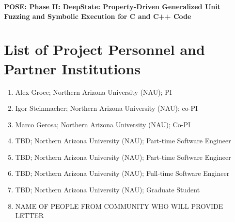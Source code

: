 \documentclass[12pt]{article}
\begin{document}
\begin{center}
{\Large\sf\textbf{POSE: Phase II: DeepState: Property-Driven Generalized Unit Fuzzing and Symbolic Execution for C and C++ Code}}
\end{center}

\section*{List of Project Personnel and Partner Institutions}

\begin{enumerate}
  \item Alex Groce;  Northern Arizona University (NAU); PI
  \item Igor Steinmacher; Northern Arizona University (NAU); co-PI
  \item Marco Gerosa; Northern Arizona University (NAU); Co-PI
  \item TBD; Northern Arizona University (NAU); Part-time Software Engineer
  \item TBD; Northern Arizona University (NAU); Part-time Software Engineer
  \item TBD; Northern Arizona University (NAU); Full-time Software Engineer
  \item TBD; Northern Arizona University (NAU); Graduate Student
  \item NAME OF PEOPLE FROM COMMUNITY WHO WILL PROVIDE LETTER
\end{enumerate}
\end{document}

